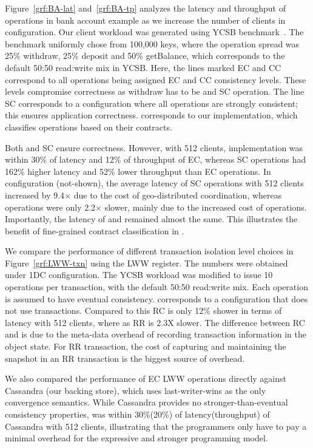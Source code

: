 Figure~\ref{grf:BA-lat} and~\ref{grf:BA-tp} analyzes the latency and throughput
of operations in bank account example as we increase the number of clients in
 configuration. Our client workload was generated using YCSB
benchmark~\cite{}. The benchmark uniformly chose from 100,000 keys, where the
operation spread was 25\% withdraw, 25\% deposit and 50\% getBalance, which
corresponds to the default 50:50 read:write mix in YCSB. Here, the lines marked
EC and CC correspond to all operations being assigned EC and CC consistency
levels. These levels compromise correctness as withdraw has to be and SC
operation. The line SC corresponds to a configuration where all operations are
strongly consistent; this ensures application correctness. \name corresponds to
our implementation, which classifies operations based on their contracts.

Both \name and SC ensure correctness. However, with 512 clients, \name
implementation was within 30\% of latency and 12\% of throughput of EC, whereas
SC operations had 162\% higher latency and 52\% lower throughput than EC
operations. In  configuration (not-shown), the average latency of SC
operations with 512 clients increased by 9.4$\times$ due to the cost of
geo-distributed coordination, whereas \name operations were only 2.2$\times$
slower, mainly due to the increased cost of  operations.
Importantly, the latency of  and  remained almost
the same. This illustrates the benefit of fine-grained contract classification
in \name.

We compare the performance of different transaction isolation level choices in
Figure~\ref{grf:LWW-txn} using the LWW register. The numbers were obtained
under 1DC configuration. The YCSB workload was modified to issue 10 operations
per transaction, with the default 50:50 read:write mix. Each operation is
assumed to have eventual consistency.  corresponds to a configuration
that does not use transactions. Compared to this RC is only 12\% shower in
terms of latency with 512 clients, where as RR is 2.3X slower. The difference
between RC and  is due to the meta-data overhead of recording
transaction information in the object state. For RR transaction, the cost of
capturing and maintaining the snapshot in an RR transaction is the biggest
source of overhead.

We also compared the performance of EC LWW operations directly against
Cassandra (our backing store), which uses last-writer-wins as the only
convergence semantics. While Cassandra provides no stronger-than-eventual
consistency properties, \name was within 30\%(20\%) of latency(throughput) of
Cassandra with 512 clients, illustrating that the programmers only have to pay
a minimal overhead for the expressive and stronger \name programming model.


